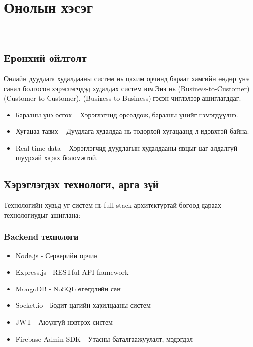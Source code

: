 
\chapter{Онолын хэсэг} %
\label{Chapter1} %


\newcommand{\keyword}[1]{\textbf{#1}}
\newcommand{\tabhead}[1]{\textbf{#1}}
\newcommand{\code}[1]{\texttt{#1}}
\newcommand{\file}[1]{\texttt{\bfseries#1}}
\newcommand{\option}[1]{\texttt{\itshape#1}}




--------------------------------------------------------
\section{Ерөнхий ойлголт}
Онлайн дуудлага худалдааны систем нь цахим орчинд барааг хамгийн өндөр үнэ санал болгосон хэрэглэгчдэд худалдах систем юм.Энэ нь  (Business-to-Customer) (Customer-to-Customer), (Business-to-Business) гэсэн чиглэлээр ашиглагддаг.
\begin{itemize}
\item Барааны үнэ өсгөх – Хэрэглэгчид өрсөлдөж, барааны үнийг нэмэгдүүлнэ.
\item Хугацаа тавих – Дуудлага худалдаа нь тодорхой хугацаанд л идэвхтэй байна.
\item Real-time data – Хэрэглэгчид дуудлагын худалдааны явцыг цаг алдалгүй шуурхай харах боломжтой.
\end{itemize}
\section{Хэрэглэгдэх технологи, арга зүй}
Технологийн хувьд уг систем нь full-stack архитектуртай бөгөөд дараах технологиудыг ашиглана:

\subsection{Backend технологи}
\begin{itemize}
\item Node.js - Серверийн орчин
\item Express.js - RESTful API framework
\item MongoDB - NoSQL өгөгдлийн сан
\item Socket.io - Бодит цагийн харилцааны систем
\item JWT - Аюулгүй нэвтрэх систем
\item Firebase Admin SDK - Утасны баталгаажуулалт, мэдэгдэл
\end{itemize}

